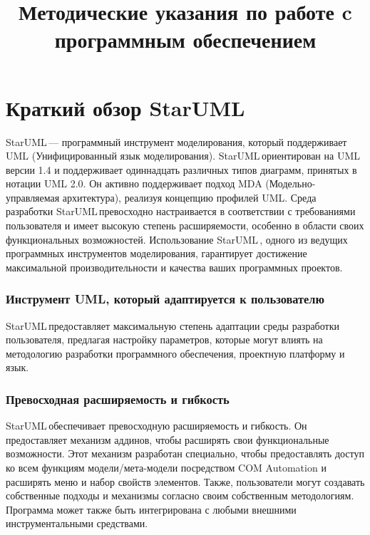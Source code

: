 \documentclass[a4paper,12pt]{extreport}
\title{Методические указания по работе c программным обеспечением \staruml}
\newcommand{\pathToCommonFolder}{../../Common}
\newcommand{\staruml}{StarUML\,\tm}
\begin{document}
\maketitle
\newpage

	
	\newpage
	\tableofcontents
	\newpage

	
	\newpage
	
	
\chapter{Краткий обзор \staruml}

\staruml --- программный инструмент моделирования, который поддерживает UML
(Унифицированный язык моделирования). \staruml ориентирован на UML версии 1.4 и
поддерживает одиннадцать различных типов диаграмм, принятых в нотации UML 2.0. Он активно
поддерживает подход MDA (Модельно-управляемая архитектура), реализуя концепцию профилей
UML. Среда разработки \staruml превосходно настраивается в соответствии с требованиями
пользователя и имеет высокую степень расширяемости, особенно в области своих
функциональных возможностей. Использование \staruml, одного из ведущих программных
инструментов моделирования, гарантирует достижение максимальной производительности и
качества ваших программных проектов.
\subsection*{Инструмент UML, который адаптируется к пользователю}
\staruml  предоставляет максимальную степень адаптации среды разработки пользователя,
предлагая настройку параметров, которые могут влиять на методологию разработки программного
обеспечения, проектную платформу и язык.

\subsection*{Превосходная расширяемость и гибкость}
\staruml  обеспечивает превосходную расширяемость и гибкость. Он предоставляет механизм
аддинов, чтобы расширять свои функциональные возможности. Этот механизм разработан
специально, чтобы предоставлять доступ ко всем функциям модели/мета-модели посредством
COM Automation и расширять меню и набор свойств элементов. Также, пользователи могут
создавать собственные подходы и механизмы согласно своим собственным методологиям.
Программа может также быть интегрирована с любыми внешними инструментальными
средствами.
\end{document}
